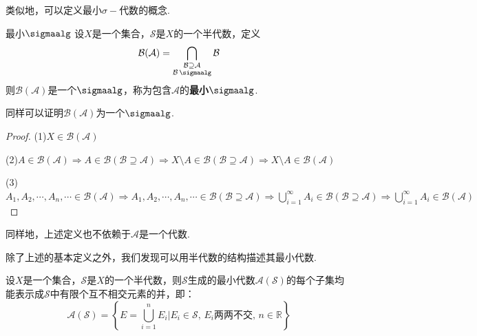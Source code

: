 类似地，可以定义最小$\sigma-\text{代数}$的概念.
\begin{definition}{最小$\sigmaalg$}
    设$X$是一个集合，$\mathcal{S}$是$X$的一个半代数，定义\[\mathcal{B}(\mathcal{A})= \bigcap_{\substack{\mathcal{B}\supseteq\mathcal{A}\\\mathcal{B}\,\sigmaalg}}{\mathcal{B}}\]
    则$\mathcal{B}(\mathcal{A})$是一个$\sigmaalg$，称为包含$\mathcal{A}$的\textbf{最小$\sigmaalg$}.
\end{definition}
同样可以证明$\mathcal{B}(\mathcal{A})$为一个$\sigmaalg$.
\begin{proof}
    (1)$X\in\mathcal{B}(\mathcal{A})$\par
    (2)$A\in\mathcal{B}(\mathcal{A})\Rightarrow A\in\mathcal{B}(\mathcal{B}\supseteq\mathcal{A})\Rightarrow X\setminus A\in\mathcal{B}(\mathcal{B}\supseteq\mathcal{A})\Rightarrow X\setminus A\in\mathcal{B}(\mathcal{A})$\par
    (3)$A_1,A_2,\cdots,A_n,\cdots\in\mathcal{B}(\mathcal{A})\Rightarrow A_1,A_2,\cdots,A_n,\cdots\in\mathcal{B}(\mathcal{B}\supseteq\mathcal{A})\Rightarrow \bigcup_{i=1}^\infty{A_i}\in\mathcal{B}(\mathcal{B}\supseteq\mathcal{A}) \Rightarrow\bigcup_{i=1}^\infty{A_i}\in\mathcal{B}(\mathcal{A})$
\end{proof}
\begin{remark}
    同样地，上述定义也不依赖于$\mathcal{A}$是一个代数.
\end{remark}
除了上述的基本定义之外，我们发现可以用半代数的结构描述其最小代数.
\begin{theorem}
    设$X$是一个集合，$\mathcal{S}$是$X$的一个半代数，则$\mathcal{S}$生成的最小代数$\mathcal{A}(\mathcal{S})$的每个子集均能表示成$\mathcal{S}$中有限个互不相交元素的并，即：
    \[\mathcal{A}(\mathcal{S})=\left\{E=\bigcup_{i=1}^n{E_i}\bigg| E_i\in\mathcal{S},\,E_i\text{两两不交},\,n\in\mathbb{R} \right\}\]
\end{theorem}
